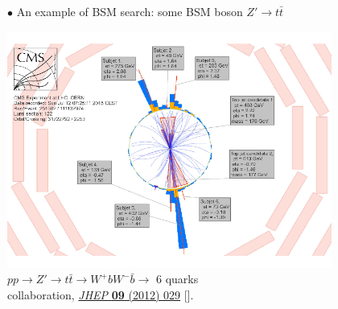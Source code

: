 \documentclass[9pt,a4paper,unknownkeysallowed,xcolor=dvipsnames,aspectratio=43]{beamer}
\begin{document}
\begin{frame}\vspace{2mm}

{\color{darkred}\Large$\bullet$} An example of BSM search: {\color{darkred}some BSM boson $Z'\to t\bar{t}$}
\vspace{2mm}
\begin{center}
\includegraphics[width=0.8\textwidth]{05/ttbar.png}\\\vspace{2mm}
$pp\to Z' \to t\bar{t}\to W^{+} b W^{-} \bar{b}\to$ 6 quarks\\\vspace{2mm}
{\tiny \color{darkblue}{\scshape CMS} collaboration, %
  \href{https://doi.org/10.1007/JHEP09(2012)029}{\emph{JHEP} {\bfseries 09}
  (2012) 029} [\href{https://arxiv.org/abs/1204.2488}{{}}].}
\end{center}

\end{frame}
%
%
\end{document}
